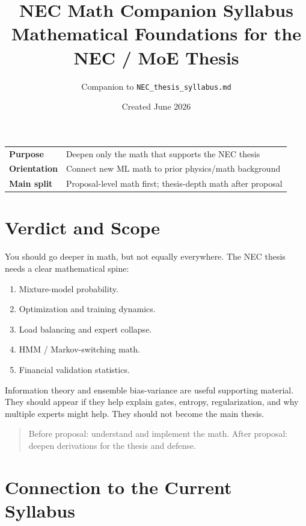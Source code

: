 \documentclass[11pt]{article}
\title{\textbf{NEC Math Companion Syllabus}\\
Mathematical Foundations for the NEC / MoE Thesis}
\author{Companion to \texttt{NEC\_thesis\_syllabus.md}}
\date{Created June 2026}
\begin{document}
\maketitle

\begin{center}
\begin{tabular}{ll}
\textbf{Purpose} & Deepen only the math that supports the NEC thesis \\
\textbf{Orientation} & Connect new ML math to prior physics/math background \\
\textbf{Main split} & Proposal-level math first; thesis-depth math after proposal \\
\end{tabular}
\end{center}

\tableofcontents
\newpage

\section{Verdict and Scope}

You should go deeper in math, but not equally everywhere. The NEC thesis needs a clear mathematical spine:

\begin{enumerate}
  \item Mixture-model probability.
  \item Optimization and training dynamics.
  \item Load balancing and expert collapse.
  \item HMM / Markov-switching math.
  \item Financial validation statistics.
\end{enumerate}

Information theory and ensemble bias-variance are useful supporting material. They should appear if they help explain gates, entropy, regularization, and why multiple experts might help. They should not become the main thesis.

\begin{quote}
Before proposal: understand and implement the math. After proposal: deepen derivations for the thesis and defense.
\end{quote}

\section{Connection to the Current Syllabus}
\end{document}

